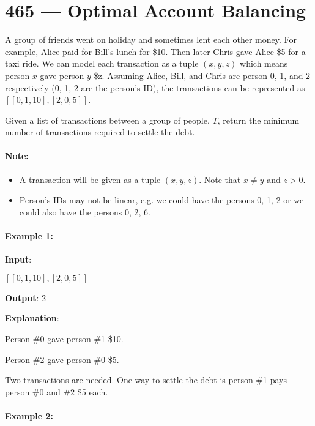 \section{465 --- Optimal Account Balancing}
A group of friends went on holiday and sometimes lent each other money. For example, Alice paid for Bill's lunch for \$10. Then later Chris gave Alice \$5 for a taxi ride. We can model each transaction as a tuple $(x, y, z)$ which means person $x$ gave person $y$ \$z. Assuming Alice, Bill, and Chris are person 0, 1, and 2 respectively (0, 1, 2 are the person's ID), the transactions can be represented as $ [[0, 1, 10], [2, 0, 5]] $.

Given a list of transactions between a group of people, $T$, return the minimum number of transactions required to settle the debt.

\paragraph{Note:}

\begin{itemize}
\item A transaction will be given as a tuple $ (x, y, z) $. Note that $x \neq y$ and $z > 0$.

\item Person's IDs may not be linear, e.g. we could have the persons 0, 1, 2 or we could also have the persons 0, 2, 6.
\end{itemize}

\paragraph{Example 1:}

\begin{flushleft}
\textbf{Input}:

$[[0,1,10], [2,0,5]]$

\textbf{Output}: 2

\textbf{Explanation}:

Person \#0 gave person \#1 \$10.

Person \#2 gave person \#0 \$5.


Two transactions are needed. One way to settle the debt is person \#1 pays person \#0 and \#2 \$5 each.
\end{flushleft}


\paragraph{Example 2:}

